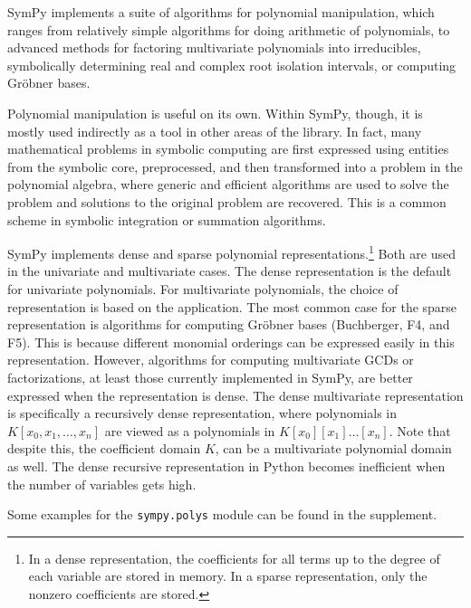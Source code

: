 
SymPy implements a suite of algorithms for polynomial manipulation,
which ranges from relatively simple algorithms for doing arithmetic of
polynomials, to advanced methods for factoring multivariate polynomials
into irreducibles, symbolically determining real and complex root isolation
intervals, or computing Gr\"{o}bner bases.

Polynomial manipulation is useful on its own. Within SymPy, though, it is mostly used
indirectly as a tool in other areas of the library. In fact, many mathematical
problems in symbolic computing are first expressed using entities from the
symbolic core, preprocessed, and then transformed into a problem in the
polynomial algebra, where generic and efficient algorithms are used to solve
the problem and solutions to the original problem are recovered.
This is a common scheme in symbolic integration or summation algorithms.

SymPy implements dense and sparse polynomial representations.\footnote{In a
dense representation, the coefficients for all terms up to the degree of each
variable are stored in memory. In a sparse representation, only the nonzero
coefficients are stored.} Both are used in the univariate and multivariate
cases. The dense representation is the default for univariate polynomials. For
multivariate polynomials, the choice of representation is based on the
application. The most common case for the sparse representation is algorithms
for computing Gr\"{o}bner bases (Buchberger, F4, and F5).
This is
because different monomial orderings can be expressed easily in this
representation. However, algorithms for computing multivariate GCDs or
factorizations, at least those currently implemented in SymPy,
are better expressed when the representation is dense. The dense multivariate
representation is specifically a recursively dense representation, where
polynomials in $K[x_0, x_1, \dotsc, x_n]$ are viewed as a polynomials in
$K[x_0][x_1]\dotso[x_n]$. Note that despite this, the coefficient domain $K$,
can be a multivariate polynomial domain as well. The dense recursive
representation in Python becomes inefficient when the number of variables gets
high.

Some examples for the \texttt{sympy.polys} module can be found in the
supplement.
